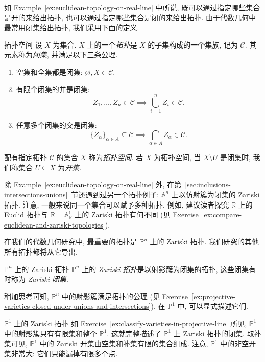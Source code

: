 如 Example~\ref{ex:euclidean-topology-on-real-line} 中所说, 既可以通过指定哪些集合是开的来给出拓扑, 也可以通过指定哪些集合是闭的来给出拓扑. 由于代数几何中最常用闭集给出拓扑, 我们采用下面的定义.

\begin{Definition}{拓扑空间}\leavevmode\label{def:topological-space}
设 $X$ 为集合. $X$ 上的一个\emph{拓扑}是 $X$ 的子集构成的一个集族, 记为 $\mathcal{C}$. 其元素称为\emph{闭集}, 并满足以下三条公理.
\begin{enumerate}[label=\arabic*.]
  \item 空集和全集都是闭集: $\varnothing,X\in\mathcal{C}$.
  \item 有限个闭集的并是闭集:
  \[
    Z_{1},\ldots,Z_{n}\in\mathcal{C}\implies
    \bigcup_{i=1}^{n}Z_{i}\in\mathcal{C}.
  \]
  \item 任意多个闭集的交是闭集:
  \[
    \{Z_{\alpha}\}_{\alpha\in A}\subseteq\mathcal{C}\implies
    \bigcap_{\alpha\in A}Z_{\alpha}\in\mathcal{C}.
  \]
\end{enumerate}
配有指定拓扑 $\mathcal{C}$ 的集合 $X$ 称为\emph{拓扑空间}. 若 $X$ 为拓扑空间, 当 $X\setminus U$ 是闭集时, 我们称集合 $U\subseteq X$ 为\emph{开集}.
\end{Definition}

除 Example~\ref{ex:euclidean-topology-on-real-line} 外, 在第~\ref{sec:inclusions-intersections-unions}~节还遇到过另一个拓扑例子: $\mathbb{A}^{n}$ 上以仿射簇为闭集的 Zariski 拓扑. 注意, 一般来说同一个集合可以赋予多种拓扑. 例如, 建议读者探究 $\mathbb{R}$ 上的 Euclid 拓扑与 $\mathbb{R}=\mathbb{A}^{1}_{\mathbb{R}}$ 上的 Zariski 拓扑有何不同 (见 Exercise~\ref{ex:compare-euclidean-and-zariski-topologies}).

在我们的代数几何研究中, 最重要的拓扑是 $\mathbb{P}^{n}$ 上的 Zariski 拓扑. 我们研究的其他所有拓扑都将从它导出.

\begin{Definition}{$\mathbb{P}^{n}$ 上的 Zariski 拓扑}\leavevmode\label{def:zariski-topology-on-projective-space}
$\mathbb{P}^{n}$ 上的 \emph{Zariski 拓扑}是以射影簇为闭集的拓扑, 这些闭集有时称为 \emph{Zariski 闭集}.
\end{Definition}

稍加思考可知, $\mathbb{P}^{n}$ 中的射影簇满足拓扑的公理 (见 Exercise~\ref{ex:projective-varieties-closed-under-unions-and-intersections}). 在 $\mathbb{P}^{1}$ 中, 可以显式描述它们.

\begin{Example}{$\mathbb{P}^{1}$ 上的 Zariski 拓扑}\leavevmode\label{ex:zariski-topology-on-projective-line}
如 Exercise~\ref{ex:classify-varieties-in-projective-line} 所见, $\mathbb{P}^{1}$ 中的射影簇只有有限集和整个 $\mathbb{P}^{1}$. 这就完整描述了 $\mathbb{P}^{1}$ 上 Zariski 拓扑的闭集. 取补集可见, $\mathbb{P}^{1}$ 中的 Zariski 开集由空集和补集有限的集合组成. 注意, $\mathbb{P}^{1}$ 中的非空开集非常大: 它们只能漏掉有限多个点.
\end{Example}


